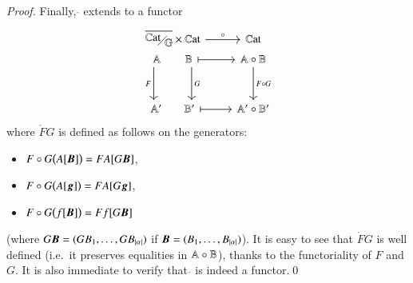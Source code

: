 \begin{proof}
    Finally, $\ring{}{}$ extends to a functor
    \[
    \begin{tikzcd}[row sep=0em]
    \WCFover\gcf \times \Cat \ar[r,"\ring{}{}"] & \Cat \\
    \A\quad\quad\,\B \ar[r,|->] \ar[d,shift right=17mu,"F"'] \ar[d,shift left=17mu,"G"] & \ring \A \B \ar[d,"\ring F G"] \\[3em] 
    {\A'}\quad\quad\B' \ar[r,|->] & \ring {\A'} {\B'}
    \end{tikzcd}
    \]
    where $\ring F G$ is defined as follows on the generators:
    \begin{itemize}
        \item $F \circ G \bigl( A[{\boldsymbol B}] \bigr) = FA[G{\boldsymbol B}]$,
        \item $F \circ G \bigl( A[{\boldsymbol g}] \bigr) = FA[G{\boldsymbol g}]$,
        \item $F \circ G \bigl( f[{\boldsymbol B}] \bigr) = Ff[G{\boldsymbol B}]$
    \end{itemize}
    (where $G{\boldsymbol B}=(GB_1,\dots,GB_{\lvert \alpha \rvert})$ if ${\boldsymbol B}=(B_1,\dots,B_{\lvert \alpha \rvert})$). It is easy to see that $\ring F G$ is well defined (i.e.\ it preserves equalities in $\mathbb A \circ \mathbb B$), thanks to the functoriality of $F$ and $G$. It is also immediate to verify that   $\ring{}{}$ is indeed a functor.\qed
\end{proof}